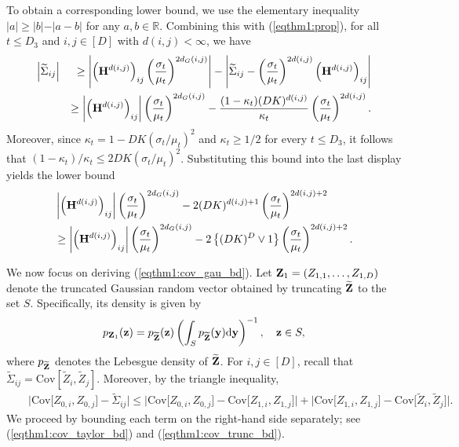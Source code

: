 \documentclass[11pt,a4paper,final]{article}
\numberwithin{equation}{section}
\theoremstyle{remark}
\newcommand{\bH}{{\bf H}}
\newcommand{\by}{{\bf y}}
\newcommand{\bz}{{\bf z}}
\newcommand{\bZ}{{\bf Z}}
\newcommand{\bbR}{{\mathbb R}}
\newcommand{\be}{\begin{equation}}
\newcommand{\ee}{\end{equation}}
\newcommand{\bean}{\setlength\arraycolsep{1pt}\begin{eqnarray*}}
\newcommand{\eean}{\end{eqnarray*}}
\def\d{{\rm d}}
\begin{document}
To obtain a corresponding lower bound, we use the elementary inequality $\vert a \vert \geq \vert b \vert - \vert a-b \vert$ for any $a,b \in \bbR$.
Combining this with (\ref{eqthm1:prop}), for all $t \leq D_{3}$ and $i,j \in [D]$ with $d(i,j) < \infty$, we have
\bean
\left\vert \widetilde \Sigma_{ij} \right\vert
&& \geq \left\vert \left( \bH^{d(i,j)} \right)_{ij} \left( \frac{\sigma_{t}}{\mu_{t}} \right)^{2 d_{G} (i,j) } \right\vert
- \left\vert \widetilde \Sigma_{ij} -  \left( \frac{\sigma_{t}}{\mu_{t}} \right)^{2 d(i,j) } \left( \bH^{d(i,j)} \right)_{ij}  \right\vert 
\\
&& \geq \left\vert \left( \bH^{d(i,j)} \right)_{ij} \right\vert \left( \frac{\sigma_{t}}{\mu_{t}} \right)^{2 d_{G} (i,j) } 
 - \frac{ (1 - \kappa_t)  ( D K )^{ d(i,j)}  }{ \kappa_t } \left( \frac{\sigma_{t}}{\mu_{t}} \right)^{2 d(i,j)}.
\eean
Moreover, since $\kappa_t = 1 - DK (\sigma_{t}/\mu_{t})^2$ and 
 $\kappa_{t} \geq 1/2$ for every $t \leq D_{3}$, it follows that
$(1-\kappa_{t})/\kappa_{t} \leq 2 D K (\sigma_{t} / \mu_t)^2$.
Substituting this bound into the last display yields the lower bound
\be
\begin{split}
& \left\vert \left( \bH^{d(i,j)} \right)_{ij} \right\vert \left( \frac{\sigma_{t}}{\mu_{t}} \right)^{2 d_{G} (i,j) }
 - 2 (DK)^{d(i,j) + 1} \left( \frac{\sigma_{t}}{\mu_{t}} \right)^{ 2 d(i,j) + 2 }
 \\
 & \geq \left\vert \left( \bH^{d(i,j)} \right)_{ij} \right\vert \left( \frac{\sigma_{t}}{\mu_{t}} \right)^{2 d_{G} (i,j) }
 - 2 \left\{ ( D K )^{D} \vee 1 \right\} \left( \frac{\sigma_{t}}{\mu_{t}} \right)^{ 2 d(i,j) + 2 }.
\label{eqthm1:cov_lower_bd}
\end{split}
\ee

We now focus on deriving (\ref{eqthm1:cov_gau_bd}).
Let $\bZ_{1} = (  Z_{1,1}, \ldots, Z_{1,D} )$ denote the truncated Gaussian random vector obtained by truncating $\widetilde \bZ$ to the set $S$.
Specifically, its density is given by
\bean
p_{\bZ_1}(\bz) = p_{\widetilde \bZ}(\bz) \left( \int_{S} p_{\widetilde \bZ}(\by) \d \by \right)^{-1}, \quad \bz \in S,
\eean
where $p_{\widetilde \bZ}$ denotes the Lebesgue density of $\widetilde \bZ$.
For $i,j \in [D]$, recall that $\widetilde \Sigma_{ij} = \text{Cov} [\widetilde Z_{i}, \widetilde Z_{j} ]$.
Moreover, by the triangle inequality,
\bean
&& \Big\vert \text{Cov} \big[ Z_{0,i}, Z_{0,j} \big] - \widetilde \Sigma_{ij} \Big\vert
\leq \Big\vert \text{Cov} \big[ Z_{0,i}, Z_{0,j} \big] - 
\text{Cov} \big[  Z_{1,i},  Z_{1,j} \big] \Big\vert
+ \Big\vert \text{Cov} \big[ Z_{1,i}, Z_{1,j} \big] - 
\text{Cov} \big[ \widetilde Z_{i}, \widetilde Z_{j} \big] \Big\vert.
\eean
We proceed by bounding each term on the right-hand side separately; see (\ref{eqthm1:cov_taylor_bd}) and (\ref{eqthm1:cov_trunc_bd}).
\end{document}
